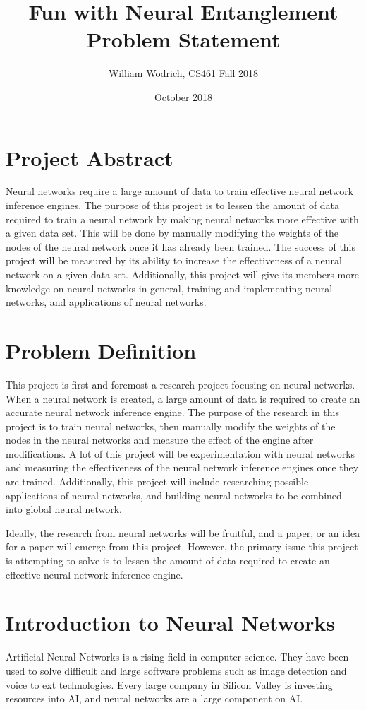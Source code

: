 \documentclass[10pt, draftclsnofoot, onecolumn]{IEEEtran}
\title{Fun with Neural Entanglement \\Problem Statement}
\author{William Wodrich, CS461 Fall 2018}
\date{October 2018}
\begin{document}
\maketitle
\section{Project Abstract}
Neural networks require a large amount of data to train effective neural network inference engines. The purpose of this project is to lessen the amount of data required to train a neural network by making neural networks more effective with a given data set. This will be done by manually modifying the weights of the nodes of the neural network once it has already been trained. The success of this project will be measured by its ability to increase the effectiveness of a neural network on a given data set. Additionally, this project will give its members more knowledge on neural networks in general, training and implementing neural networks, and applications of neural networks.

\section{Problem Definition}
This project is first and foremost a research project focusing on neural networks. When a neural network is created, a large amount of data is required to create an accurate neural network inference engine. The purpose of the research in this project is to train neural networks, then manually modify the weights of the nodes in the neural networks and measure the effect of the engine after modifications. A lot of this project will be experimentation with neural networks and measuring the effectiveness of the neural network inference engines once they are trained. Additionally, this project will include researching possible applications of neural networks, and building neural networks to be combined into global neural network. 

Ideally, the research from neural networks will be fruitful, and a paper, or an idea for a paper will emerge from this project. However, the primary issue this project is attempting to solve is to lessen the amount of data required to create an effective neural network inference engine.

\section{Introduction to Neural Networks}
Artificial Neural Networks is a rising field in computer science. They have been used to solve difficult and large software problems such as image detection and voice to ext technologies. Every large company in Silicon Valley is investing resources into AI, and neural networks are a large component on AI.
\end{document}
